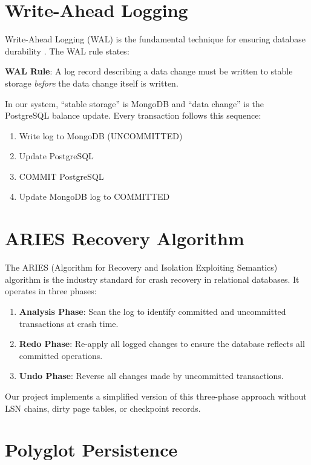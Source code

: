 \section{Write-Ahead Logging}

Write-Ahead Logging (WAL) is the fundamental technique for ensuring database
durability \cite{mohan1992}. The WAL rule states:

\begin{conceptbox}
\textbf{WAL Rule}: A log record describing a data change must be written to
stable storage \textit{before} the data change itself is written.
\end{conceptbox}

In our system, ``stable storage'' is MongoDB and ``data change'' is the
PostgreSQL balance update. Every transaction follows this sequence:
\begin{enumerate}
  \item Write log to MongoDB (UNCOMMITTED)
  \item Update PostgreSQL
  \item COMMIT PostgreSQL
  \item Update MongoDB log to COMMITTED
\end{enumerate}

\section{ARIES Recovery Algorithm}

The ARIES (Algorithm for Recovery and Isolation Exploiting Semantics) algorithm
\cite{mohan1992} is the industry standard for crash recovery in relational
databases. It operates in three phases:

\begin{enumerate}
  \item \textbf{Analysis Phase}: Scan the log to identify committed and
        uncommitted transactions at crash time.
  \item \textbf{Redo Phase}: Re-apply all logged changes to ensure the
        database reflects all committed operations.
  \item \textbf{Undo Phase}: Reverse all changes made by uncommitted
        transactions.
\end{enumerate}

Our project implements a simplified version of this three-phase approach
without LSN chains, dirty page tables, or checkpoint records.

\section{Polyglot Persistence}

